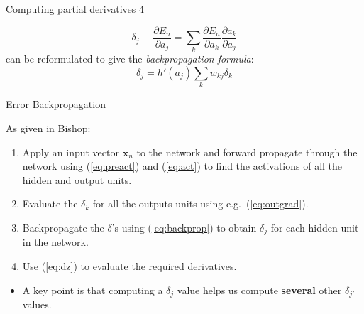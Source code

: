 \documentclass[10pt]{beamer}
\begin{document}
\begin{titledslide}{Computing partial derivatives 4}

  \[
    \delta_{j} \equiv \frac{\partial E_{n}}{\partial a_{j}} = \sum_{k} \frac{\partial E_{n}}{\partial a_{k}}\frac{\partial a_{k}}{\partial a_{j}} 
  \]
  can be reformulated to give the \emph{backpropagation formula}:
  \begin{equation}
    \label{eq:backprop}
    \delta_{j} = h'(a_{j})\sum_{k}w_{kj}\delta_{k}
  \end{equation}
    
\end{titledslide}
\begin{titledslide}{Error Backpropagation}

  As given in Bishop:

  \begin{enumerate}
  \item Apply an input vector $\mathbf{x}_n$ to the network and
    forward propagate through the network using (\ref{eq:preact}) and
    (\ref{eq:act}) to find the activations of all the hidden and
    output units.
  \item Evaluate the $\delta_k$ for all the outputs units using
    e.g.\ (\ref{eq:outgrad}).
   \item Backpropagate the $\delta$'s using (\ref{eq:backprop}) to
     obtain $\delta_j$ for each hidden unit in the network.
  \item Use (\ref{eq:dz}) to evaluate the required derivatives.
  \end{enumerate}

  \vspace*{1cm}
  
  \begin{itemize}
  \item A key point is that computing a $\delta_j$ value helps us
    compute \textbf{several} other $\delta_{j'}$ values.
  \end{itemize}
  
\end{titledslide}
\end{document}
